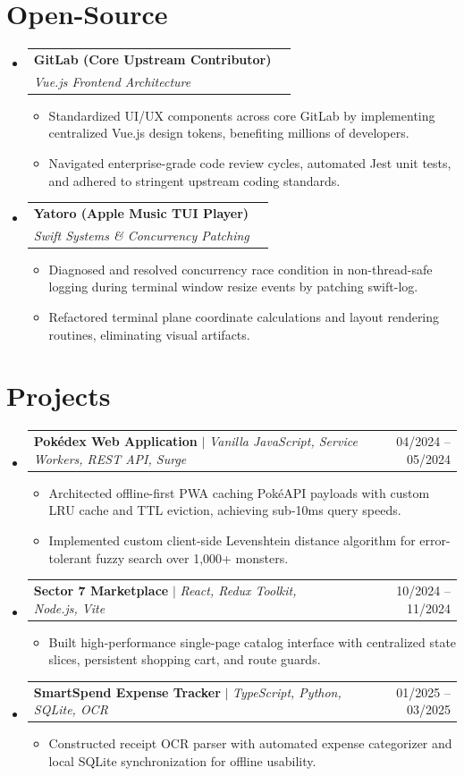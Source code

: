 \documentclass[letterpaper,10pt]{article}
\makeatletter
\newcommand{\resumeItem}[1]{\item\small{{#1 \vspace{-2pt}}}}
\newcommand{\resumeSubheading}[4]{
  \vspace{-2pt}\item
    \begin{tabular*}{0.97\textwidth}[t]{l@{\extracolsep{\fill}}r}
      \textbf{#1} & #2 \\
      \textit{\small#3} & \textit{\small #4} \\
    \end{tabular*}\vspace{-7pt}
}
\newcommand{\resumeProjectHeading}[2]{
    \item
    \begin{tabular*}{0.97\textwidth}{l@{\extracolsep{\fill}}r}
      \small#1 & #2 \\
    \end{tabular*}\vspace{-7pt}
}
\newcommand{\resumeSubHeadingListStart}{\begin{itemize}[leftmargin=0.15in, label={}]}
\newcommand{\resumeSubHeadingListEnd}{\end{itemize}}
\newcommand{\resumeItemListStart}{\begin{itemize}}
\newcommand{\resumeItemListEnd}{\end{itemize}\vspace{-5pt}}
\makeatother
\begin{document}
\section{Open-Source}
\resumeSubHeadingListStart
  \resumeSubheading{GitLab (Core Upstream Contributor)}{}{Vue.js Frontend Architecture}{}
  \resumeItemListStart
    \resumeItem{Standardized UI/UX components across core GitLab by implementing centralized Vue.js design tokens, benefiting millions of developers.}
    \resumeItem{Navigated enterprise-grade code review cycles, automated Jest unit tests, and adhered to stringent upstream coding standards.}
  \resumeItemListEnd
  \resumeSubheading{Yatoro (Apple Music TUI Player)}{}{Swift Systems \& Concurrency Patching}{}
  \resumeItemListStart
    \resumeItem{Diagnosed and resolved concurrency race condition in non-thread-safe logging during terminal window resize events by patching swift-log.}
    \resumeItem{Refactored terminal plane coordinate calculations and layout rendering routines, eliminating visual artifacts.}
  \resumeItemListEnd
\resumeSubHeadingListEnd

\section{Projects}
\resumeSubHeadingListStart
  \resumeProjectHeading{\textbf{Pokédex Web Application} $|$ \emph{Vanilla JavaScript, Service Workers, REST API, Surge}}{04/2024 -- 05/2024}
  \resumeItemListStart
    \resumeItem{Architected offline-first PWA caching PokéAPI payloads with custom LRU cache and TTL eviction, achieving sub-10ms query speeds.}
    \resumeItem{Implemented custom client-side Levenshtein distance algorithm for error-tolerant fuzzy search over 1,000+ monsters.}
  \resumeItemListEnd
  \resumeProjectHeading{\textbf{Sector 7 Marketplace} $|$ \emph{React, Redux Toolkit, Node.js, Vite}}{10/2024 -- 11/2024}
  \resumeItemListStart
    \resumeItem{Built high-performance single-page catalog interface with centralized state slices, persistent shopping cart, and route guards.}
  \resumeItemListEnd
  \resumeProjectHeading{\textbf{SmartSpend Expense Tracker} $|$ \emph{TypeScript, Python, SQLite, OCR}}{01/2025 -- 03/2025}
  \resumeItemListStart
    \resumeItem{Constructed receipt OCR parser with automated expense categorizer and local SQLite synchronization for offline usability.}
  \resumeItemListEnd
\resumeSubHeadingListEnd

\end{document}
